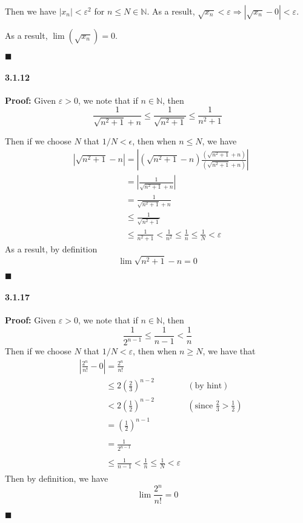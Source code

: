\documentclass[11pt]{article}
\newcommand{\qed}{
	\begin{flushright}
		$\blacksquare$
	\end{flushright}		
}
\begin{document}
		Then we have $|x_n| < \varepsilon^2$ for $n \leq N \in \mathbb{N}$. As a result, $\sqrt{x_n} < \varepsilon \Rightarrow |\sqrt{x_n} - 0| < \varepsilon$.
		
		As a result, $\lim(\sqrt{x_n}) = 0$.
		\qed
		
	\paragraph{3.1.12}\textbf{Proof:}
		Given $\varepsilon > 0$, we note that if $n \in \mathbb{N}$, then
						\[\frac{1}{\sqrt{n^2 + 1} + n} \leq \frac{1}{\sqrt{n^2 + 1}} \leq \frac{1}{n^2 + 1}  \]
			
		Then if we choose $N$ that $1/N < \epsilon$, then when $n \leq N$, we have
			\begin{align}
				&\left|\sqrt{n^2 + 1} - n\right| = \left|(\sqrt{n^2 + 1} - n)\frac{(\sqrt{n^2 + 1} + n)}{(\sqrt{n^2 + 1} + n)}\right|\nonumber\\
				&\phantom{\left|\sqrt{n^2 + 1} - n\right|} = \left|\frac{1}{\sqrt{n^2 + 1} + n} \right|\nonumber\\ 
				&\phantom{\left|\sqrt{n^2 + 1} - n\right|} = \frac{1}{\sqrt{n^2 + 1} + n}\nonumber\\
				&\phantom{\left|\sqrt{n^2 + 1} - n\right|} \leq \frac{1}{\sqrt{n^2 + 1}}\nonumber\\
				&\phantom{\left|\sqrt{n^2 + 1} - n\right|} \leq \frac{1}{n^2 + 1} < \frac{1}{n^2} \leq \frac{1}{n} \leq \frac{1}{N} < \varepsilon \nonumber
			\end{align}
		As a result, by definition
			\[\lim \sqrt{n^2 + 1} - n = 0\]
			\qed
	\paragraph{3.1.17}\textbf{Proof:}
		Given $\varepsilon > 0$, we note that if $n \in \mathbb{N}$, then
						\[\frac{1}{2^{n - 1}} \leq \frac{1}{n - 1} < \frac{1}{n}\]
				Then if we choose $N$ that $1/N < \varepsilon$, then when $n \geq N$, we have that
					\begin{align}
						&\left|\frac{2^n}{n!} - 0\right| = \frac{2^n}{n!}\nonumber\\
						&\phantom{\left|\frac{2^n}{n!} - 0\right|} \leq 2(\frac{2}{3})^{n - 2} & (\text{by hint})\nonumber\\
						&\phantom{\left|\frac{2^n}{n!} - 0\right|} < 2(\frac{1}{2})^{n - 2} & (\text{since }\frac{2}{3} > \frac{1}{2})\nonumber\\
						&\phantom{\left|\frac{2^n}{n!} - 0\right|} = (\frac{1}{2})^{n - 1}\nonumber\\
						&\phantom{\left|\frac{2^n}{n!} - 0\right|} = \frac{1}{2^{n - 1}}\nonumber\\
						&\phantom{\left|\frac{2^n}{n!} - 0\right|} \leq \frac{1}{n - 1} < \frac{1}{n} \leq \frac{1}{N} < \varepsilon \nonumber
					\end{align}
				Then by definition, we have 
					\[\lim \frac{2^n}{n!} = 0\]
				\qed
\end{document}
